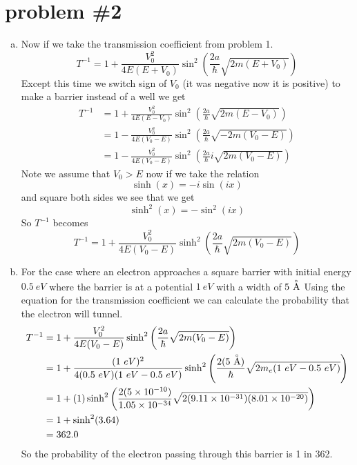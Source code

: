 \documentclass[11pt]{article}
\numberwithin{equation}{section}
\begin{document}
\section{problem \#2}
\begin{enumerate}[(a)]
\item
Now if we take the transmission coefficient from problem 1.
$$T^{-1} =  1+\frac{V_0^2}{4E(E+V_0)}\sin^2\left(\frac{2a}{\hbar}\sqrt{2m(E+V_0)}\right)$$
Except this time we switch sign of $V_0$ (it was negative now it is positive) to make a barrier instead of a well we get
\begin{align*}
T^{-1} &=  1+\frac{V_0^2}{4E(E-V_0)}\sin^2\left(\frac{2a}{\hbar}\sqrt{2m(E-V_0)}\right)\\
&=  1-\frac{V_0^2}{4E(V_0-E)}\sin^2\left(\frac{2a}{\hbar}\sqrt{-2m(V_0-E)}\right)\\
&=  1-\frac{V_0^2}{4E(V_0-E)}\sin^2\left(\frac{2a}{\hbar}i\sqrt{2m(V_0-E)}\right)
\end{align*}
Note we assume that $V_0>E$ now if we take the relation
\begin{equation}
\sinh(x) = -i\sin(ix)
\label{Sinh}
\end{equation}
and square both sides we see that we get
$$\sinh^2(x) = -\sin^2(ix)$$
So $T^{-1}$ becomes 
$$T^{-1} =  1+\frac{V_0^2}{4E(V_0-E)}\sinh^2\left(\frac{2a}{\hbar}\sqrt{2m(V_0-E)}\right)$$

\item
For the case where an electron approaches a square barrier with initial energy $0.5\ eV$ where the barrier is at a potential $1\ eV$ with a width of $5\ {\buildrel _{\circ} \over{\mathrm{A}}}$ Using the equation for the transmission coefficient we can calculate the probability that the electron will tunnel. 
\begin{align*}
T^{-1} &=  1+\frac{V_0^2}{4E(V_0-E)}\sinh^2\left(\frac{2a}{\hbar}\sqrt{2m(V_0-E)}\right)\\
&=  1+\frac{(1\ eV)^2}{4(0.5\ eV)(1\ eV-0.5\ eV)}\sinh^2\left(\frac{2(5\ {\buildrel _{\circ} \over{\mathrm{A}}})}{\hbar}\sqrt{2m_e(1\ eV-0.5\ eV)}\right)\\
&=  1+(1)\sinh^2\left(\frac{2(5\times10^{-10})}{1.05\times10^{-34}}\sqrt{2(9.11\times10^{-31})(8.01\times10^{-20})}\right)\\
&= 1 + \sinh^2(3.64)\\
&= 362.0
\end{align*}
So the probability of the electron passing through this barrier is 1 in 362. 



\end{enumerate}
\end{document}
